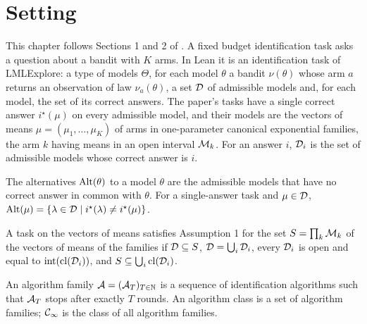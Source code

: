 \chapter{Setting}
\label{chap:setting}

This chapter follows Sections 1 and 2 of \cite{D23}. A fixed budget identification task asks a
question about a bandit with $K$ arms. In Lean it is an identification task of LMLExplore: a type
of models $\Theta$, for each model $\theta$ a bandit $\nu(\theta)$ whose arm $a$ returns an
observation of law $\nu_a(\theta)$, a set $\mathcal{D}$ of admissible models and, for each model, the set
of its correct answers. The paper's tasks have a single correct answer $i^{\star}(\mu)$ on every
admissible model, and their models are the vectors of means $\mu = (\mu_1, \dots, \mu_K)$ of arms
in one-parameter canonical exponential families, the arm $k$ having means in an open interval
$\mathcal{M}_k$. For an answer $i$, $\mathcal{D}_i$ is the set of admissible models whose correct answer is $i$.

\begin{definition}
  \label{def:alternatives}
  \leanok
  The alternatives $\mathrm{Alt}(\theta)$ to a model $\theta$ are the admissible models that have no
  correct answer in common with $\theta$. For a single-answer task and $\mu \in \mathcal{D}$,
  $\mathrm{Alt}(\mu) = \{\lambda \in \mathcal{D} \mid i^{\star}(\lambda) \ne i^{\star}(\mu)\}$.
\end{definition}

\begin{definition}[{\cite[Assumption 1]{D23}}]
  \label{asm:answer_nhds}
  \leanok
  A task on the vectors of means satisfies Assumption 1 for the set $S = \prod_k \mathcal{M}_k$ of the
  vectors of means of the families if $\mathcal{D} \subseteq S$, $\mathcal{D} = \bigcup_i \mathcal{D}_i$, every $\mathcal{D}_i$ is
  open and equal to $\mathrm{int}(\mathrm{cl}(\mathcal{D}_i))$, and $S \subseteq \bigcup_i \mathrm{cl}(\mathcal{D}_i)$.
\end{definition}

\begin{definition}
  \label{def:fixed_budget_family}
  \leanok
  An algorithm family $\mathcal{A} = (\mathcal{A}_T)_{T \in \mathbb{N}}$ is a sequence of identification algorithms such
  that $\mathcal{A}_T$ stops after exactly $T$ rounds. An algorithm class is a set of algorithm families;
  $\mathcal{C}_{\infty}$ is the class of all algorithm families.
\end{definition}

